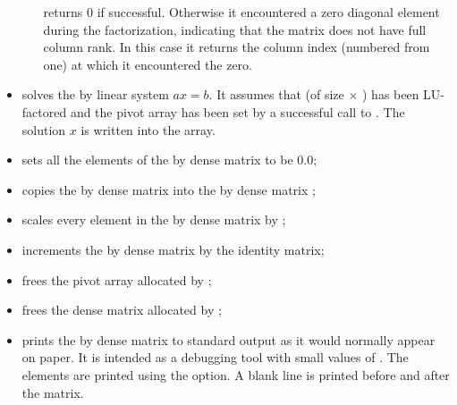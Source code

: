 \begin{itemize}
\begin{enumerate}
     returns 0 if successful. Otherwise it encountered a zero  
    diagonal element during the factorization, indicating that the matrix 
    does not have full column rank.
    In this case it returns the column index (numbered from one) at which it       
    encountered the zero.
    \end{enumerate}

\item {}
  \par {} solves the  by  linear system $ax = b$. 
  It assumes that  (of size  $\times$ ) has been LU-factored 
  and the pivot array  has been set by a successful call to 
  . The solution $x$ is written into the  array.

\item {}
  \par {} sets all the elements of the  by  dense matrix
   to be $0.0$;

\item {}
  \par {} copies the  by  dense matrix  into the
   by  dense matrix ;

\item {}
  \par {} scales every element in the  by  dense
  matrix  by ;

\item {}
  \par {} increments the  by  dense matrix  by the
  identity matrix;

\item {}
  \par {} frees the pivot array  allocated by ;

\item {}
  \par {} frees the dense matrix  allocated by ;

\item {}
  \par {} prints the  by  dense matrix 
   to standard output as it would normally appear on paper. 
  It is intended as a debugging tool with small values of . 
  The elements are printed using the  option. A blank line 
  is printed before and after the matrix. 

\end{itemize}

